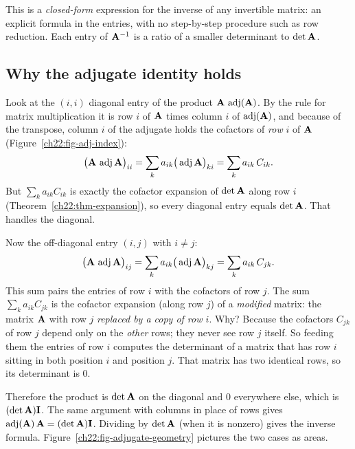 This is a \emph{closed-form} expression for the inverse of any invertible matrix: an explicit
formula in the entries, with no step-by-step procedure such as row reduction. Each entry of
$\mathbf{A}^{-1}$ is a ratio of a smaller determinant to $\det\mathbf{A}$.

\subsection{Why the adjugate identity holds}

Look at the $(i,i)$ diagonal entry of the product $\mathbf{A}\,\operatorname{adj}(\mathbf{A})$. By the rule
for matrix multiplication it is row $i$ of $\mathbf{A}$ times column $i$ of $\operatorname{adj}(\mathbf{A})$,
and because of the transpose, column $i$ of the adjugate holds the cofactors of \emph{row} $i$ of
$\mathbf{A}$ (Figure~\ref{ch22:fig-adj-index}):
\[
\big(\mathbf{A}\,\operatorname{adj}\mathbf{A}\big)_{ii}
=\sum_{k} a_{ik}\big(\operatorname{adj}\mathbf{A}\big)_{ki}
=\sum_{k} a_{ik}\,C_{ik}.
\]
But $\sum_k a_{ik}C_{ik}$ is exactly the cofactor expansion of $\det\mathbf{A}$ along row $i$
(Theorem~\ref{ch22:thm-expansion}), so every diagonal entry equals $\det\mathbf{A}$. That handles the
diagonal.

Now the off-diagonal entry $(i,j)$ with $i\neq j$:
\[
\big(\mathbf{A}\,\operatorname{adj}\mathbf{A}\big)_{ij}
=\sum_{k} a_{ik}\big(\operatorname{adj}\mathbf{A}\big)_{kj}
=\sum_{k} a_{ik}\,C_{jk}.
\]
This sum pairs the entries of row $i$ with the cofactors of row $j$. The sum
$\sum_k a_{ik}C_{jk}$ is the cofactor expansion (along row $j$) of a \emph{modified} matrix: the
matrix $\mathbf{A}$ with row $j$ \emph{replaced by a copy of row $i$}. Why? Because the cofactors $C_{jk}$
of row $j$ depend only on the \emph{other} rows; they never see row $j$ itself. So feeding them the
entries of row $i$ computes the determinant of a matrix that has row $i$ sitting in both position $i$
and position $j$. That matrix has two identical rows, so its determinant is $0$.

Therefore the product is $\det\mathbf{A}$ on the diagonal and $0$ everywhere else, which is $(\det\mathbf{A})\mathbf{I}$. The same argument with columns in place of rows gives $\operatorname{adj}(\mathbf{A})\,\mathbf{A}
=(\det\mathbf{A})\mathbf{I}$. Dividing by $\det\mathbf{A}$ (when it is nonzero) gives the inverse formula.
Figure~\ref{ch22:fig-adjugate-geometry} pictures the two cases as areas.

